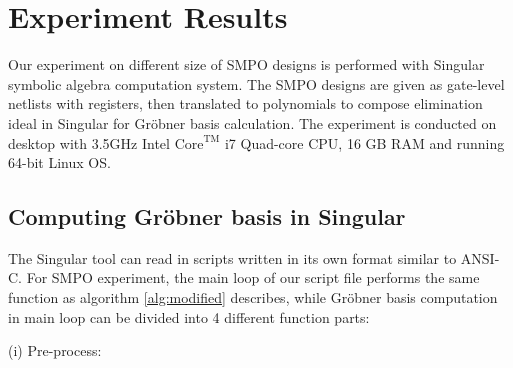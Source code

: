 \section{Experiment Results}
Our experiment on different size of SMPO designs is performed with Singular symbolic algebra computation system.
The SMPO designs are given as gate-level netlists with registers, then translated to polynomials to compose
elimination ideal in Singular for Gr\"obner basis calculation. The experiment is conducted on desktop with
3.5GHz Intel $\text{Core}^\text{TM}$ i7 Quad-core CPU, 16 GB RAM and running 64-bit Linux OS.

\subsection{Computing Gr\"obner basis in Singular}
The Singular tool can read in scripts written in its own format similar to ANSI-C. For SMPO experiment, the main 
loop of our script file performs the same function as algorithm \ref{alg:modified} describes, while Gr\"obner basis
computation in main loop can be divided into 4 different function parts:

(i) Pre-process:

